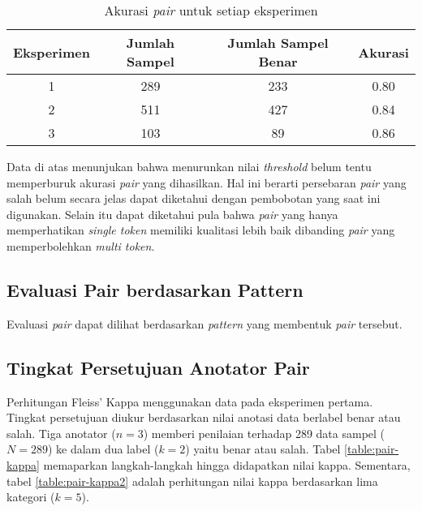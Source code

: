 \begin{table}
  \centering
  \caption{Akurasi \textit{pair} untuk setiap eksperimen}
  \label{table:akurasi-all}
  \begin{tabular}{|c|c|c|c|}
  \hline
  Eksperimen & Jumlah Sampel & Jumlah Sampel Benar & Akurasi \\ \hline
  1 & 289 & 233 & 0.80 \\ \hline
  2 & 511 & 427 & 0.84 \\ \hline
  3 & 103 & 89 & 0.86 \\ \hline
  \end{tabular} 
\end{table}

Data di atas menunjukan bahwa menurunkan nilai \textit{threshold} belum tentu memperburuk akurasi \textit{pair} yang dihasilkan. Hal ini berarti persebaran \textit{pair} yang salah belum secara jelas dapat diketahui dengan pembobotan yang saat ini digunakan. Selain itu dapat diketahui pula bahwa \textit{pair} yang hanya memperhatikan \textit{single token} memiliki kualitasi lebih baik dibanding \textit{pair} yang memperbolehkan \textit{multi token}.

\subsection{Evaluasi Pair berdasarkan Pattern}
Evaluasi \textit{pair} dapat dilihat berdasarkan \textit{pattern} yang membentuk \textit{pair} tersebut.


\subsection{Tingkat Persetujuan Anotator Pair}
Perhitungan Fleiss' Kappa menggunakan data pada eksperimen pertama. Tingkat persetujuan diukur berdasarkan nilai anotasi data berlabel benar atau salah. Tiga anotator ($n=3$) memberi penilaian terhadap 289 data sampel ($N=289$) ke dalam dua label ($k=2$) yaitu benar atau salah. Tabel \ref{table:pair-kappa} memaparkan langkah-langkah hingga didapatkan nilai kappa. Sementara, tabel \ref{table:pair-kappa2} adalah perhitungan nilai kappa berdasarkan lima kategori ($k=5$).

